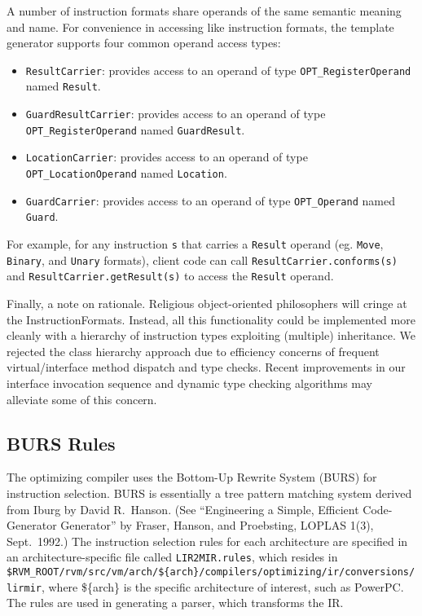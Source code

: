 A number of instruction formats share operands of 
the same semantic meaning and name.  For convenience in accessing
like instruction formats, the template generator supports four
common operand access types:
\begin{itemize}
\item {\tt ResultCarrier}: provides access to an operand of type {\tt OPT\_RegisterOperand} named {\tt Result}.
\item {\tt GuardResultCarrier}: provides access to an operand of type {\tt OPT\_RegisterOperand} named {\tt GuardResult}.
\item {\tt LocationCarrier}: provides access to an operand of type {\tt OPT\_LocationOperand} named {\tt Location}.
\item {\tt GuardCarrier}: provides access to an operand of type {\tt OPT\_Operand} named {\tt Guard}.
\end{itemize}

For example, for any instruction {\tt s} that carries a {\tt Result} operand
(eg. {\tt Move}, {\tt Binary}, and {\tt Unary} formats), client code can call
{\tt ResultCarrier.conforms(s)} and {\tt ResultCarrier.getResult(s)} to access
the {\tt Result} operand.

Finally, a note on rationale.  Religious object-oriented philosophers
will cringe at the InstructionFormats.  Instead, all this
functionality could be implemented more cleanly with a hierarchy of
instruction types exploiting (multiple) inheritance.  We rejected the
class hierarchy approach due to efficiency concerns of frequent
virtual/interface method dispatch and type checks.  Recent
improvements in our interface invocation sequence and dynamic type
checking algorithms may alleviate some of this concern.

\subsection{BURS Rules}\label{burs}

The optimizing compiler uses the Bottom-Up Rewrite System (BURS) for
instruction selection.  BURS is essentially a tree pattern matching
system derived from Iburg by David R.\ Hanson.   (See ``Engineering a
Simple, Efficient Code-Generator Generator'' by Fraser, Hanson, and
Proebsting, LOPLAS 1(3), Sept.\ 1992.)
The instruction selection rules for each architecture are specified in an
architecture-specific file called {\tt LIR2MIR.rules}, which resides in
{\tt \$RVM\_\-ROOT/\-rvm/\-src/\-vm/\-arch/\-\$\{arch\}/\-compilers/\-op\-ti\-mi\-zing/\-ir/\-con\-ver\-sions/\-lir\-mir}, where \$\{arch\} is the
specific architecture of interest, such as PowerPC\TMweb.
The rules are 
used in generating a parser, which transforms the IR.

